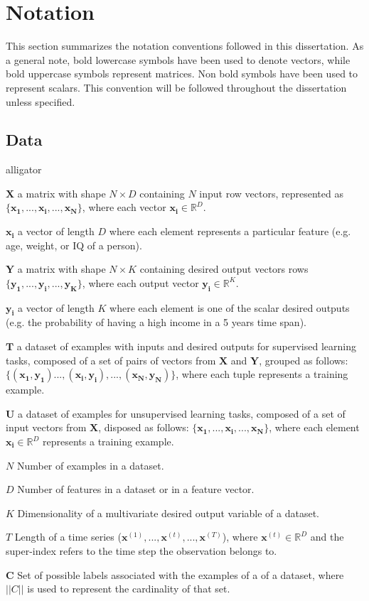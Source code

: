 \chapter*{Notation} \label{ch:notation}
This section summarizes the notation conventions followed in this dissertation. As a general note, bold lowercase symbols have been used to denote vectors, while bold uppercase symbols represent matrices. Non bold symbols have been used to represent scalars. This convention will be followed throughout the dissertation unless specified.

\section*{Data}

\begin{labeling}{alligator}
	\item [$\mathbf{X}$] a matrix with shape $N \times D$ containing $N$ input row vectors, represented as $\{\mathbf{x_1},...,\mathbf{x_i},...,\mathbf{x_N}\}$, where each vector $\mathbf{x_i} \in \mathbb{R}^D$.
	\item [$\mathbf{x_i}$] a vector of length $D$ where each element represents a particular feature (e.g. age, weight, or IQ of a person).
	\item [$\mathbf{Y}$] a matrix with shape $N \times K$ containing desired output vectors rows $\{\mathbf{y_1},...,\mathbf{y_i},...,\mathbf{y_K}\}$, where each output vector $\mathbf{y_i} \in \mathbb{R}^K$.
	\item [$\mathbf{y_i}$]  a vector of length $K$ where each element is one of the scalar desired outputs (e.g. the probability of having a high income in a 5 years time span).
	\item [$\mathbf{T}$] a dataset  of examples with inputs and desired outputs for supervised learning tasks, composed of a set of pairs of vectors from $\mathbf{X}$ and $\mathbf{Y}$, grouped as follows: $\{(\mathbf{x_1}, \mathbf{y_1})...,(\mathbf{x_i}, \mathbf{y_i}),...,(\mathbf{x_N}, \mathbf{y_N})\}$, where each tuple represents a training example.
	\item [$\mathbf{U}$] a dataset of examples for unsupervised learning tasks, composed of a set of input vectors from $\mathbf{X}$, disposed as follows: $\{\mathbf{x_1},...,\mathbf{x_i},...,\mathbf{x_N}\}$, where each element $\mathbf{x_i} \in \mathbb{R}^D$ represents a training example.
	\item [$N$] Number of examples in a dataset.
	\item [$D$]  Number of features in a dataset or in a feature vector.
	\item [$K$] Dimensionality of a multivariate desired output variable of a dataset.
	\item [$T$] Length of a time series ($\mathbf{x}^{(1)}, ..., \mathbf{x}^{(t)}, ..., \mathbf{x}^{(T)}$), where $\mathbf{x}^{(t)} \in \mathbb{R}^D$ and the super-index refers to the time step the observation belongs to.
	\item [$\mathbf{C}$] Set of possible labels associated with the examples of a of a dataset, where $||C||$ is used to represent the cardinality of that set.
\end{labeling}

